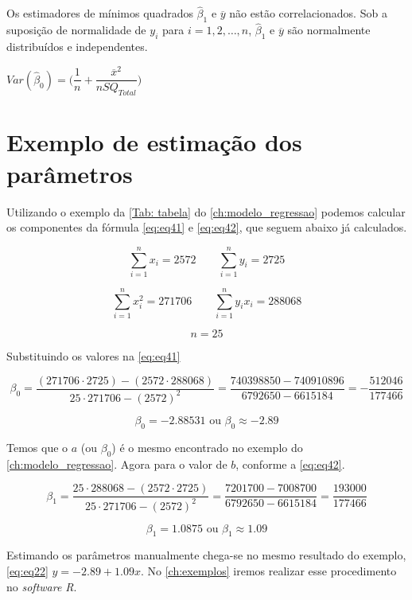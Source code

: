 \begin{teorema}
Os estimadores de mínimos quadrados $\hat{\beta}_1$ e $\overline{y}$ não estão correlacionados. Sob a suposição de normalidade de $y_i$ para $i = 1, 2,\dots, n$, $\hat{\beta}_1$ e $\overline{y}$ são normalmente distribuídos e independentes.
\end{teorema}

\begin{teorema}
$Var(\hat{\beta}_0) = \bigg( \dfrac{1}{n} + \dfrac{\overline{x}^2}{nSQ_{Total}} \bigg) $
\end{teorema}

\section{Exemplo de estimação dos parâmetros}

\noindent Utilizando o exemplo da \autoref{Tab: tabela} do \autoref{ch:modelo_regressao} podemos calcular os componentes da fórmula \autoref{eq:eq41} e \autoref{eq:eq42}, que seguem abaixo já calculados.

$$ \sum_{i=1}^{n} x_i = 2572 \qquad \sum_{i=1}^{n} y_i = 2725$$

$$ \sum_{i=1}^{n} x_i^2 = 271706 \qquad \sum_{i=1}^{n} y_i x_i = 288068$$

$$n=25$$

\noindent Substituindo os valores na \autoref{eq:eq41}

$$\beta_0 =  \dfrac{(271706 \cdot 2725) - (2572 \cdot 288068)}{25 \cdot 271706 - (2572)^2} = \dfrac{740398850 - 740910896}{6792650 - 6615184}  = -\dfrac{512046}{177466}$$

$$\beta_0 = -2.88531 \text{ ou } \boxed{\beta_0 \approx -2.89}$$

\noindent Temos que o $a$ (ou $\beta_0$) é o mesmo encontrado no exemplo do \autoref{ch:modelo_regressao}. Agora para o valor de $b$, conforme a \autoref{eq:eq42}.

$$\beta_1 = \dfrac{25 \cdot 288068 - (2572 \cdot 2725)}{25 \cdot 271706 - (2572)^2} = \dfrac{7201700 - 7008700}{6792650 - 6615184} = \dfrac{193000}{177466}$$

$$\beta_1 = 1.0875 \text{ ou } \boxed{\beta_1 \approx 1.09}$$

\noindent Estimando os parâmetros manualmente chega-se no mesmo resultado do exemplo, \autoref{eq:eq22} $y = -2.89 + 1.09x$. No \autoref{ch:exemplos} iremos realizar esse procedimento no \textit{software R}. 




